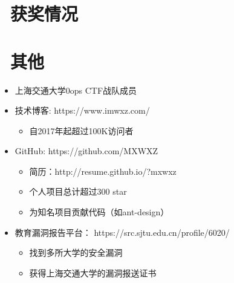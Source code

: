 \documentclass{resume}
\begin{document}
\section{\faHeartO\ 获奖情况}

\section{\faInfo\ 其他}
\begin{itemize}[parsep=0.5ex]
    \item 上海交通大学0ops CTF战队成员
    \item 技术博客: https://www.imwxz.com/
          \begin{itemize}
              \item 自2017年起超过100K访问者
          \end{itemize}
    \item GitHub: https://github.com/MXWXZ
          \begin{itemize}
              \item 简历：http://resume.github.io/?mxwxz
              \item 个人项目总计超过300 star
              \item 为知名项目贡献代码（如ant-design）
          \end{itemize}
    \item 教育漏洞报告平台： https://src.sjtu.edu.cn/profile/6020/
          \begin{itemize}
              \item 找到多所大学的安全漏洞
              \item 获得上海交通大学的漏洞报送证书
          \end{itemize}
\end{itemize}

%
%
\end{document}
